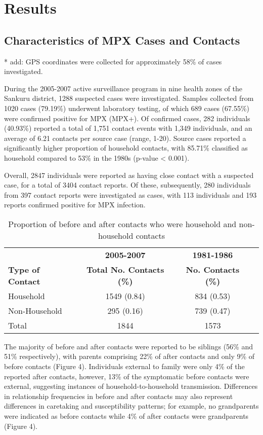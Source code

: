 \section{Results}

\subsection{Characteristics of MPX Cases and Contacts}

* add: GPS coordinates were collected for approximately 58\% of cases investigated. 

During the 2005-2007 active surveillance program in nine health zones of the Sankuru district, 1288 suspected cases were investigated. Samples collected from 1020 cases (79.19\%) underwent laboratory testing, of which 689 cases (67.55\%) were confirmed positive for MPX (MPX+). Of confirmed cases, 282 individuals (40.93\%) reported a total of 1,751 contact events with 1,349 individuals, and an average of 6.21 contacts per source case (range, 1-20). Source cases reported a significantly higher proportion of household contacts, with 85.71\% classified as household compared to 53\% in the 1980s (p-value < 0.001).



Overall, 2847 individuals were reported as having close contact with a suspected case, for a total of 3404 contact reports. Of these, 
subsequently, 280 individuals from 397 contact reports were investigated as cases, with 113 individuals and 193 reports confirmed positive for MPX infection. 

\begin{table}
\centering
\begin{tabular}{lccc} 
\tabletypesize{\footnotesize}
\toprule
& \textbf{2005-2007} & \textbf{1981-1986} \\
\cmidrule(l){2-3}
\textbf{Type of Contact}  &	\textbf{Total No. Contacts (\%)} &	\textbf{ No. Contacts (\%)} \\
\midrule
Household  & 1549 (0.84) & 834 (0.53) \\
Non-Household  &	295	(0.16) & 739 (0.47) \\
\midrule
Total &	1844 & 1573  \\
\bottomrule
\end{tabular}
\caption{Proportion of before and after contacts who were household and non-household contacts}
\label{tab:table1}
\end{table}



The majority of before and after contacts were reported to be siblings (56\% and 51\% respectively), with parents comprising 22\% of after contacts and only 9\% of before
contacts (Figure 4). Individuals external to family were only 4\% of the reported after contacts, however, 13\% of the symptomatic before contacts were external, suggesting instances of household-to-household transmission. Differences in relationship frequencies in before and after contacts may also represent differences in caretaking and susceptibility patterns; for example, no grandparents were indicated as before contacts while 4\% of after contacts were grandparents (Figure 4).
